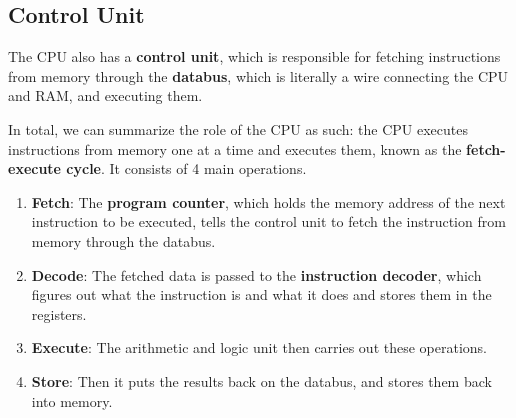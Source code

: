 \subsection{Control Unit} 

  The CPU also has a \textbf{control unit}, which is responsible for fetching instructions from memory through the \textbf{databus}, which is literally a wire connecting the CPU and RAM, and executing them. 

  In total, we can summarize the role of the CPU as such: the CPU executes instructions from memory one at a time and executes them, known as the \textbf{fetch-execute cycle}. It consists of 4 main operations. 
  \begin{enumerate} 
    \item \textbf{Fetch}: The \textbf{program counter}, which holds the memory address of the next instruction to be executed, tells the control unit to fetch the instruction from memory through the databus. 
    \item \textbf{Decode}: The fetched data is passed to the \textbf{instruction decoder}, which figures out what the instruction is and what it does and stores them in the registers.
    \item \textbf{Execute}: The arithmetic and logic unit then carries out these operations. 
    \item \textbf{Store}: Then it puts the results back on the databus, and stores them back into memory.
  \end{enumerate} 


